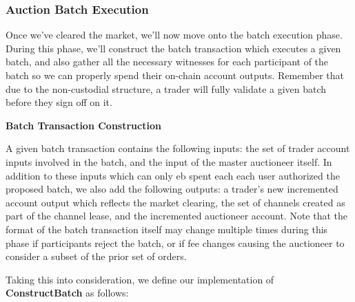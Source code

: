 \documentclass[10pt,a4paper]{article}
\theoremstyle{definition}
\begin{document}

\subsubsection{Auction Batch Execution}

Once we've cleared the market, we'll now move onto the batch execution phase.
During this phase, we'll construct the batch transaction which executes a given
batch, and also gather all the necessary witnesses for each participant of the
batch so we can properly spend their on-chain account outputs. Remember
that due to the non-custodial structure, a trader will fully validate a given
batch before they sign off on it.

\begin{center}
    \textbf{Batch Transaction Construction}
\end{center}

A given batch transaction contains the following inputs: the set of trader
account inputs involved in the batch, and the input of the master auctioneer
itself. In addition to these inputs which can only eb spent each each user
authorized the proposed batch, we also add the following outputs: a trader's
new incremented account output which reflects the market clearing, the set of
channels created as part of the channel lease, and the incremented auctioneer
account. Note that the format of the batch transaction itself may change
multiple times during this phase if participants reject the batch, or if fee
changes causing the auctioneer to consider a subset of the prior set of orders.

Taking this into consideration, we define our implementation of
\textbf{ConstructBatch} as follows: 
\begin{pcvstack}[boxed,center, space=1em]
\end{pcvstack}
\end{document}
